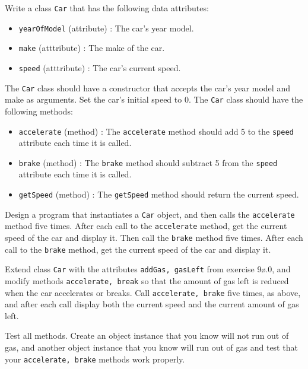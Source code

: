Write a class \texttt{Car} that has the following data attributes:
  \begin{itemize}
  \item \texttt{yearOfModel} (attribute) : The car's year model.
  \item \texttt{make} (atttribute) : The make of the car.
  \item \texttt{speed} (atttribute) : The car's current speed.
  \end{itemize}
  The \texttt{Car} class should have a constructor that accepts the car's year model and make as arguments. Set the car's initial speed to 0.  The \texttt{Car} class should have the following methods:
  \begin{itemize}
  \item \texttt{accelerate} (method) : The \texttt{accelerate} method should add 5 to the \texttt{speed} attribute each time it is called.
  \item \texttt{brake} (method) : The \texttt{brake} method should subtract 5 from the \texttt{speed} attribute each time it is called.
  \item \texttt{getSpeed} (method) : The \texttt{getSpeed} method should return the current speed.
  \end{itemize}
  Design a program that instantiates a \texttt{Car} object, and then calls the \texttt{accelerate} method five times. After each call to the \texttt{accelerate} method, get the current speed of the car and display it. Then call the \texttt{brake} method five times. After each call to the \texttt{brake} method, get the current speed of the car and display it.
  
  Extend class \texttt{Car} with the attributes \texttt{addGas, gasLeft} from exercise 9ø.0, and modify methods \texttt{accelerate, break} so that the amount of gas left is reduced when the car accelerates or breaks. Call \texttt{accelerate, brake} five times, as above, and after each call display both the current speed and the current amount of gas left.
  
  Test all methods. Create an object instance that you know will not run out of gas, and another object instance that you know will run out of gas and test that your \texttt{accelerate, brake} methods work properly.
  
